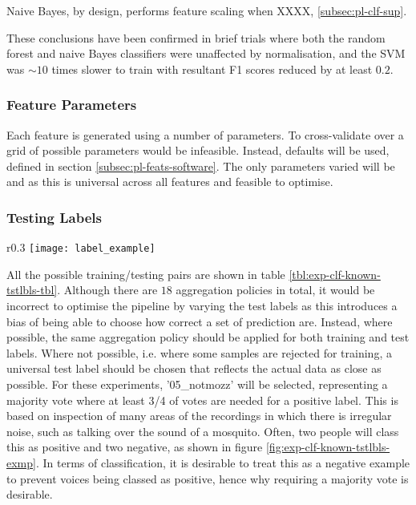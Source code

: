             Naive Bayes, by design, performs feature scaling when XXXX, \ref{subsec:pl-clf-sup}. 
            
            These conclusions have been confirmed in brief trials where both the random forest and naive Bayes classifiers were unaffected by normalisation, and the SVM was $\sim10$ times slower to train with resultant F1 scores reduced by at least $0.2$.
    
            
        \subsubsection{Feature Parameters}
        \label{subsubsec:exp-clf-known-featparam}
            Each feature is generated using a number of parameters. To cross-validate over a grid of possible parameters would be infeasible. Instead, defaults will be used, defined in section \ref{subsec:pl-feats-software}. The only parameters varied will be  and  as this is universal across all features and feasible to optimise.
        
        \subsubsection{Testing Labels}
        \label{subsubsec:exp-clf-known-tstlbls}
            \begin{wrapfigure}{r}{0.3\textwidth}
                \centering
                \texttt{[image: label\_example]}
                \caption{An example of talking where there is disagreement between people.}
                \label{fig:exp-clf-known-tstlbls-exmp}
            \end{wrapfigure}
            All the possible training/testing pairs are shown in table \ref{tbl:exp-clf-known-tstlbls-tbl}. Although there are $18$ aggregation policies in total, it would be incorrect to optimise the pipeline by varying the test labels as this introduces a bias of being able to choose how correct a set of prediction are. Instead, where possible, the same aggregation policy should be applied for both training and test labels. Where not possible, i.e. where some samples are rejected for training, a universal test label should be chosen that reflects the actual data as close as possible. For these experiments, '05\_notmozz' will be selected, representing a majority vote where at least 3/4 of votes are needed for a positive label. This is based on inspection of many areas of the recordings in which there is irregular noise, such as talking over the sound of a mosquito. Often, two people will class this as positive and two negative, as shown in figure \ref{fig:exp-clf-known-tstlbls-exmp}. In terms of classification, it is desirable to treat this as a negative example to prevent voices being classed as positive, hence why requiring a majority vote is desirable.
            
